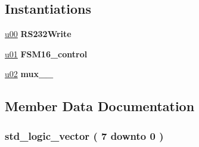 \subsection*{Instantiations}
 \begin{DoxyCompactItemize}
\item 
\hyperlink{class_r_s232_write__16_1_1moore_a47c959174c33814179fa80cd86e9fdd1}{u00}  {\bfseries R\+S232\+Write}   
\item 
\hyperlink{class_r_s232_write__16_1_1moore_a261149681baa370af616d05085c60b21}{u01}  {\bfseries F\+S\+M16\+\_\+control}   
\item 
\hyperlink{class_r_s232_write__16_1_1moore_a59af0c0173456dd2b8087a3882ac1a52}{u02}  {\bfseries mux\+\_\+\_}   
\end{DoxyCompactItemize}


\subsection{Member Data Documentation}
\hypertarget{class_r_s232_write__16_1_1moore_a3b08085e58e4e71e997771e87e333486}{}
\subsubsection[{D\+A\+T\+A\+W\+R}]{ {\bfseries \textcolor{comment}{std\+\_\+logic\+\_\+vector}\textcolor{vhdlchar}{ }\textcolor{vhdlchar}{(}\textcolor{vhdlchar}{ }\textcolor{vhdlchar}{ } \textcolor{vhdldigit}{7} \textcolor{vhdlchar}{ }\textcolor{keywordflow}{downto}\textcolor{vhdlchar}{ }\textcolor{vhdlchar}{ } \textcolor{vhdldigit}{0} \textcolor{vhdlchar}{ }\textcolor{vhdlchar}{)}\textcolor{vhdlchar}{ }} \hspace{0.3cm}{\ttfamily [Signal]}}\label{class_r_s232_write__16_1_1moore_a3b08085e58e4e71e997771e87e333486}
\hypertarget{class_r_s232_write__16_1_1moore_ad5028bba71b98c2321c8deaa4bd765a7}{}
